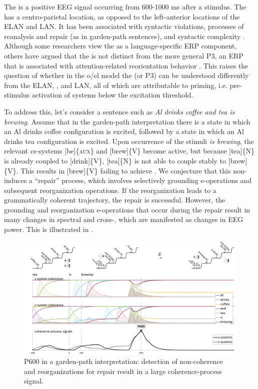   The  is a positive EEG signal occurring from 600-1000 ms after a stimulus. The  has a centro-parietal location, as opposed to the left-anterior locations of the ELAN and LAN. It has been associated with syntactic violations, processes of reanalysis and repair (as in garden-path sentences), and syntactic complexity \citep{Friederici2002}. Although some researchers view the  as a language-specific ERP component, others have argued that the  is not distinct from the more general P3, an ERP that is associated with attention-related reorientation behavior \citep{SassenhagenBornkessel-Schlesewsky2015}. This raises the question of whether in the o/el model the  (or P3) can be understood differently from the ELAN, , and LAN, all of which are attributable to priming, i.e. pre-stimulus activation of systems below the excitation threshold.

  To address this, let's consider a  sentence such as \textit{Al drinks coffee and tea is brewing}. Assume that in the garden-path interpretation there is a state in which an {\textbar}Al drinks coffee{\textbar} configuration is excited, followed by a state in which an {\textbar}Al drinks tea{\textbar} configuration is excited. Upon occurrence of the stimuli \textit{is brewing}, the relevant cs-systems [be]\{\textsc{aux}\} and [brew]\{V\} become active, but because [tea]\{N\} is already coupled to [drink]\{V\}, [tea]\{N\} is not able to couple stably to [brew]\{V\}. This results in [brew]\{V\} failing to achieve . We conjecture that this non- induces a “repair” process, which involves selectively grounding e-operations and subsequent reorganization operations. If the reorganization leads to a grammatically coherent trajectory, the repair is successful. However, the grounding and reorganization e-operations that occur during the repair result in many changes in spectral and cross-, which are manifested as changes in EEG power. This is illustrated in {}.

  
\begin{figure}
\includegraphics[width=\textwidth]{figures/Tilsen-img144.png}
\caption{P600 in a garden-path interpretation: detection of non-coherence and reorganizations for repair result in a large coherence-process signal.}
\label{fig:6:25}
\end{figure}
 

